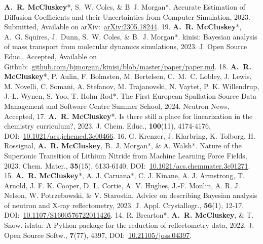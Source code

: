 \begin{cvpubys}
   \cvpuby
    {\textbf{A.~R. McCluskey}*, S.~W. Coles, \& B~J. Morgan*.}
    {Accurate Estimation of Diffusion Coefficients and their Uncertainties from Computer Simulation,}
    {2023.}
    {Submitted,}
    {}
    {Available on arXiv:~\href{https://arxiv.org/abs/2305.18244}{arXiv:2305.18244}.}
    {19.}
  \cvpuby
    {\textbf{A.~R. McCluskey}*, A.~G. Squires, J.~Dunn, S.~W. Coles, \& B.~J. Morgan*.}
    {kinisi: Bayesian analysis of mass transport from molecular dynamics simulations,}
    {2023.}
    {J. Open Source Educ., Accepted,}
    {}
    {Available on Github:~\href{https://github.com/bjmorgan/kinisi/blob/master/paper/paper.md}{github.com/bjmorgan/kinisi/blob/master/paper/paper.md}.}
    {18.}
  \cvpuby
    {\textbf{A.~R. McCluskey}*, P. Aulin, F. Bolmsten, M. Bertelsen, C.~M.~C. Lobley, J. Lewis, M. Novelli, C. Somani, A. Stefanov, M. Trajanovski, N. Vaytet, P. K. Willendrup, J.-L. Wynen, S. Yoo, T. Holm Rod*.}
    {The First European Spallation Source Data Management and Software Centre Summer School,}
    {2024.}
    {Neutron News, Accepted,}
    {}
    {}
    {17.}
   \cvpuby
    {\textbf{A.~R. McCluskey}*.}
    {Is there still a place for linearization in the chemistry curriculum?,}
    {2023.}
    {J. Chem. Educ.,}
    {\textbf{100}(11), 4174-4176,}
    {DOI:~\href{https://doi.org/10.1021/acs.jchemed.3c00466}{10.1021/acs.jchemed.3c00466}.}
    {16.}
  \cvpuby
    {G. Krenzer, J. Klarbring, K. Tolborg, H. Rossignal, \textbf{A.~R. McCluskey}, B.~J. Morgan*, \& A. Walsh*.}
    {Nature of the Superionic Transition of Lithium Nitride from Machine Learning Force Fields,}
    {2023.}
    {Chem. Mater.,}
    {\textbf{35}(15), 6133-6140,}
    {DOI:~\href{https://doi.org/10.1021/acs.chemmater.3c01271}{10.1021/acs.chemmater.3c01271}.}
    {15.}
  \cvpuby
    {\textbf{A.~R. McCluskey}*, A. J. Caruana*, C. J. Kinane, A. J. Armstrong, T. Arnold, J. F. K. Cooper, D. L. Cortie, A. V. Hughes, J.-F. Moulin, A. R. J. Nelson, W. Potrzebowski, \& V. Starostin.}
    {Advice on describing Bayesian analysis of neutron and X-ray reflectometry,}
    {2023.}
    {J. Appl. Crystallogr.,}
    {\textbf{56}(1), 12-17,}
    {DOI:~\href{https://doi.org/10.1107/S1600576722011426}{10.1107/S1600576722011426}.}
    {14.}
  \cvpuby
    {R. Brearton*, \textbf{A.~R. McCluskey}, \& T. Snow.}
    {islatu: A Python package for the reduction of reflectometry data,}
    {2022.}
    {J. Open Source Softw.,}
    {\textbf{7}(77), 4397,}
    {DOI:~\href{https://doi.org/10.21105/joss.04397}{10.21105/joss.04397}.}

\end{cvpubys}
